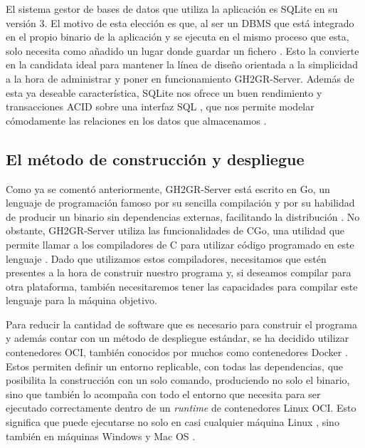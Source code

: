 El sistema gestor de bases de datos que utiliza la aplicación es SQLite en su versión 3. El motivo de esta elección es que, al ser un \acrshort{DBMS} que está integrado en el propio binario de la aplicación y se ejecuta en el mismo proceso que esta, solo necesita como añadido un lugar donde guardar un fichero \cite{sqliteAboutSQLite}. Esto la convierte en la candidata ideal para mantener la línea de diseño orientada a la simplicidad a la hora de administrar y poner en funcionamiento GH2GR-Server. Además de esta ya deseable característica, SQLite nos ofrece un buen rendimiento y transacciones \acrshort{ACID} sobre una interfaz \acrshort{SQL} \cite{sqliteAboutSQLite}, que nos permite modelar cómodamente las relaciones en los datos que almacenamos \cite{Beaulieu2009-jq}.

\subsection{El método de construcción y despliegue} \label{title:gh2gr-server-build-and-deploy}
Como ya se comentó anteriormente, GH2GR-Server está escrito en Go, un lenguaje de programación famoso por su sencilla compilación y por su habilidad de producir un binario sin dependencias externas, facilitando la distribución \cite{goDevelopmentCLI}. No obstante, GH2GR-Server utiliza las funcionalidades de CGo, una utilidad que permite llamar a los compiladores de C para utilizar código programado en este lenguaje \cite{goCGo}. Dado que utilizamos estos compiladores, necesitamos que estén presentes a la hora de construir nuestro programa y, si deseamos compilar para otra plataforma, también necesitaremos tener las capacidades para compilar este lenguaje para la máquina objetivo.

Para reducir la cantidad de software que es necesario para construir el programa y además contar con un método de despliegue estándar, se ha decidido utilizar contenedores OCI, también conocidos por muchos como contenedores Docker \cite{ociFAQ}. Estos permiten definir un entorno replicable, con todas las dependencias, que posibilita la construcción con un solo comando, produciendo no solo el binario, sino que también lo acompaña con todo el entorno que necesita para ser ejecutado correctamente dentro de un \textit{runtime} de contenedores Linux OCI. Esto significa que puede ejecutarse no solo en casi cualquier máquina Linux \cite{mobyReadme, podmanWhatPodman}, sino también en máquinas Windows y Mac OS \cite{dockerDockerDesktop, rancherdesktopIntroductionRancher, podmandesktopIntroductionPodman}.


